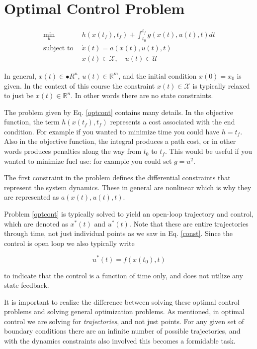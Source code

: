 \documentclass[twoside]{article}
\begin{document}
\section{Optimal Control Problem}

\begin{equation} \label{optcont}
\begin{split}
\underset{u}{\text{min}} \:\: &h(x(t_f),t_f) + \int_{t_0}^{t_f} g(x(t),u(t),t) dt \\
\text{subject to} \:\: &\dot{x}(t) = a(x(t),u(t),t) \\
&x(t) \in \mathcal{X}, \quad u(t) \in \mathcal{U}
\end{split}
\end{equation}

In general, $x(t) \in \mathbb{•}{R}^n$, $u(t) \in \mathbb{R}^m$, and the initial condition $x(0) = x_0$ is given. In the context of this course the constraint $x(t) \in \mathcal{X}$ is typically relaxed to just be $x(t) \in \mathbb{R}^n$. In other words there are no state constraints.

The problem given by Eq. \ref{optcont} contains many details. In the objective function, the term $h(x(t_f),t_f)$ represents a cost associated with the end condition. For example if you wanted to minimize time you could have $h = t_f$. Also in the objective function, the integral produces a path cost, or in other words produces penalties along the way from $t_0$ to $t_f$. This would be useful if you wanted to minimize fuel use: for example you could set $g = u^2$.

The first constraint in the problem defines the differential constraints that represent the system dynamics. These in general are nonlinear which is why they are represented as $a(x(t),u(t),t)$.

Problem \ref{optcont} is typically solved to yield an open-loop trajectory and control, which are denoted as $x^*(t)$ and $u^*(t)$. Note that these are entire trajectories through time, not just individual points as we saw in Eq. \ref{const}. Since the control is open loop we also typically write

$$u^*(t) = f(x(t_0),t)$$

to indicate that the control is a function of time only, and does not utilize any state feedback.

It is important to realize the difference between solving these optimal control problems and solving general optimization problems. As mentioned, in optimal control we are solving for \textit{trajectories}, and not just points. For any given set of boundary conditions there are an infinite number of possible trajectories, and with the dynamics constraints also involved this becomes a formidable task.
\end{document}
